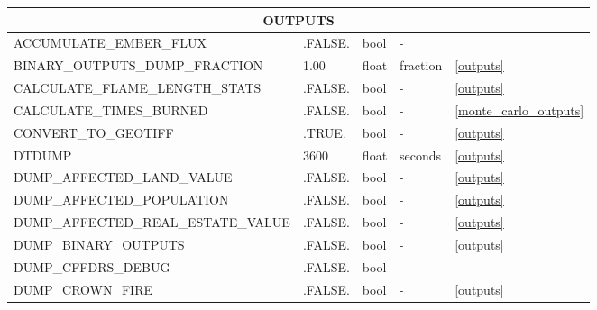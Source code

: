 \begin{landscape}
\begin{center}
\begin{longtable}{lllll}
\multicolumn{5}{c}{OUTPUTS}                                                                                                                                                    \\
\toprule
ACCUMULATE\_EMBER\_FLUX                      & .FALSE.                    & bool                   & -                                  &                                \\
BINARY\_OUTPUTS\_DUMP\_FRACTION              & 1.00                       & float                  & fraction                           & \ref{outputs}                        \\
CALCULATE\_FLAME\_LENGTH\_STATS              & .FALSE.                    & bool                   & -                                  & \ref{outputs}                        \\
CALCULATE\_TIMES\_BURNED                     & .FALSE.                    & bool                   & -                                  & \ref{monte_carlo_outputs}            \\
CONVERT\_TO\_GEOTIFF                         & .TRUE.                     & bool                   & -                                  & \ref{outputs}                        \\
DTDUMP                                       & 3600                       & float                  & seconds                            & \ref{outputs}                        \\
DUMP\_AFFECTED\_LAND\_VALUE                  & .FALSE.                    & bool                   & -                                  & \ref{outputs}                        \\
DUMP\_AFFECTED\_POPULATION                   & .FALSE.                    & bool                   & -                                  & \ref{outputs}                        \\
DUMP\_AFFECTED\_REAL\_ESTATE\_VALUE          & .FALSE.                    & bool                   & -                                  & \ref{outputs}                        \\
DUMP\_BINARY\_OUTPUTS                        & .FALSE.                    & bool                   & -                                  & \ref{outputs}                        \\
DUMP\_CFFDRS\_DEBUG                          & .FALSE.                    & bool                   & -                                  &  \\
DUMP\_CROWN\_FIRE                            & .FALSE.                    & bool                   & -                                  & \ref{outputs}                        \\

\end{longtable}
\end{center}
\end{landscape}
